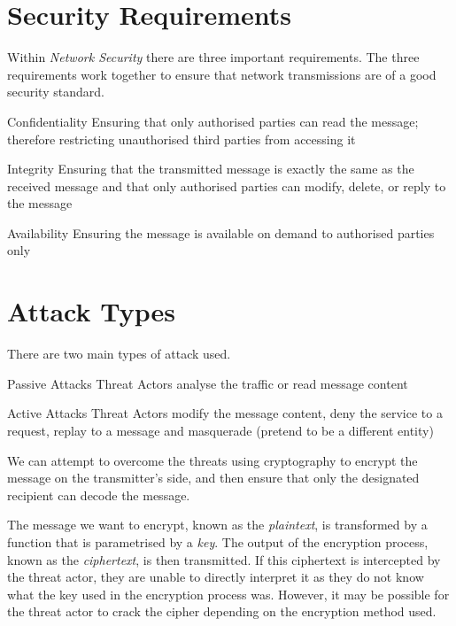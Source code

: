
\section{Security Requirements}
Within \textit{Network Security} there are three important requirements. The three requirements work together to ensure that network transmissions are of a good security standard.
\begin{define}
\item[Confidentiality] Ensuring that only authorised parties can read the message; therefore restricting unauthorised third parties from accessing it
\item[Integrity] Ensuring that the transmitted message is exactly the same as the received message and that only authorised parties can modify, delete, or reply to the message
\item[Availability] Ensuring the message is available on demand to authorised parties only
\end{define}

\section{Attack Types}
There are two main types of attack used.

\begin{define}
\item[Passive Attacks] Threat Actors analyse the traffic or read message content
\item[Active Attacks] Threat Actors modify the message content, deny the service to a request, replay to a message and masquerade (pretend to be a different entity) 
\end{define}

We can attempt to overcome the threats using cryptography to encrypt the message on the transmitter's side, and then ensure that only the designated recipient can decode the message.

The message we want to encrypt, known as the \textit{plaintext}, is transformed by a function that is parametrised by a \textit{key}. The output of the encryption process, known as the \textit{ciphertext}, is then transmitted. If this ciphertext is intercepted by the threat actor, they are unable to directly interpret it as they do not know what the key used in the encryption process was. However, it may be possible for the threat actor to crack the cipher depending on the encryption method used.

